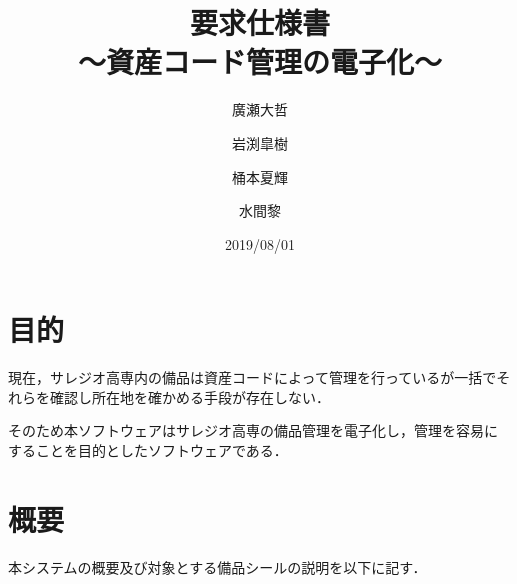 \documentclass[11pt,a4j]{jarticle}
\title{要求仕様書\\～資産コード管理の電子化～}
\author{廣瀬大哲 \and 岩渕皐樹 \and 桶本夏輝 \and 水間黎}
\date{2019/08/01}
\begin{document}
  \maketitle
  \thispagestyle{empty}
  
  \newpage
  
   \tableofcontents
  \newpage
  \section{目的}
  現在，サレジオ高専内の備品は資産コードによって管理を行っているが一括でそれらを確認し所在地を確かめる手段が存在しない．
  
  そのため本ソフトウェアはサレジオ高専の備品管理を電子化し，管理を容易にすることを目的としたソフトウェアである．

  \section{概要}
  本システムの概要及び対象とする備品シールの説明を以下に記す．\par
  
\end{document}
